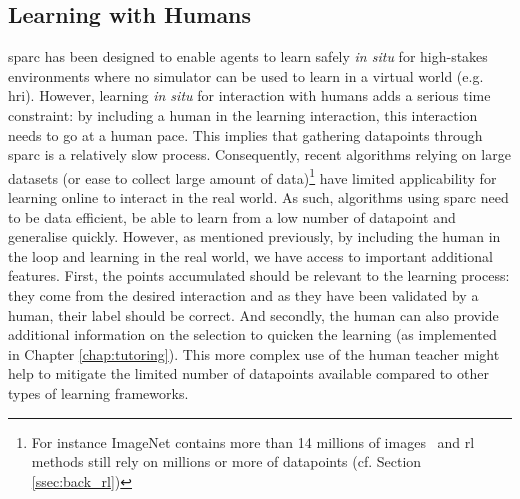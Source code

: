 \subsection{Learning with Humans}


\gls{sparc} has been designed to enable agents to learn safely \textit{in situ} for high-stakes environments where no simulator can be used to learn in a virtual world (e.g. \gls{hri}). However, learning \textit{in situ} for interaction with humans adds a serious time constraint: by including a human in the learning interaction, this interaction needs to go at a human pace. This implies that gathering datapoints through \gls{sparc} is a relatively slow process. 
Consequently, recent algorithms relying on large datasets (or ease to collect large amount of data)\footnote{For instance ImageNet contains more than 14 millions of images~\citep{russakovsky2015imagenet} and \gls{rl} methods still rely on millions or more of datapoints (cf. Section \ref{ssec:back_rl})} have limited applicability for learning online to interact in the real world. 
As such, algorithms using \gls{sparc} need to be data efficient, be able to learn from a low number of datapoint and generalise quickly. However, as mentioned previously, by including the human in the loop and learning in the real world, we have access to important additional features. First, the points accumulated should be relevant to the learning process: they come from the desired interaction and as they have been validated by a human, their label should be correct. And secondly, the human can also provide additional information on the selection to quicken the learning (as implemented in Chapter \ref{chap:tutoring}). This more complex use of the human teacher might help to mitigate the limited number of datapoints available compared to other types of learning frameworks.


